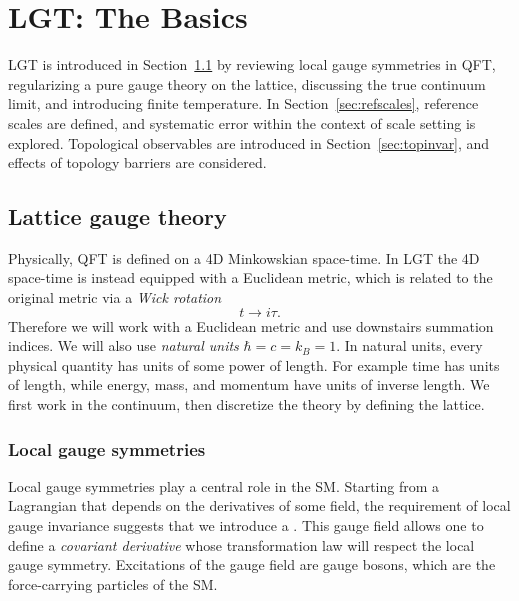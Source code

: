 \chapter{LGT: The Basics}\label{ch:preliminaries}

LGT is introduced in Section~\ref{sec:LGT}
by reviewing local gauge symmetries in QFT, regularizing a pure
gauge theory on the lattice, discussing the true continuum limit,
and introducing finite temperature. In Section~\ref{sec:refscales}, 
reference scales are defined, and systematic error within the context
of scale setting is explored. Topological observables are introduced
in Section~\ref{sec:topinvar}, and effects of topology barriers
are considered.

\section{Lattice gauge theory}\label{sec:LGT}

Physically, QFT is defined on a 4D Minkowskian space-time. In LGT 
the 4D space-time is instead equipped with a Euclidean metric, which is 
related to the original metric via a {\it Wick rotation}
\begin{equation}
  t\to i\tau.
\end{equation} 
Therefore we will work with a Euclidean metric
and use downstairs summation indices. 
We will also use {\it natural units}
$\hbar=c=k_B=1$. In natural units, every physical
quantity has units of some power of length. For example
time has units of length, while energy, mass, and momentum
have units of inverse length. 
We first work in the continuum, then 
discretize the theory by defining the lattice.

\subsection{Local gauge symmetries}

Local gauge symmetries play a central role in the SM. 
Starting from a Lagrangian that depends on the derivatives of
some field, the requirement of local gauge invariance suggests that
we introduce a . 
This gauge field allows one to define a {\it covariant derivative} 
 whose transformation law will 
respect the local gauge symmetry.
Excitations of the gauge field are gauge bosons,
which are the force-carrying particles of the SM.

